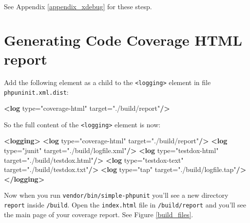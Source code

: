 \documentclass[a4paperpaper,openright]{book}
\newenvironment{Shaded}{}{}
\newcommand{\KeywordTok}[1]{\textcolor[rgb]{0.00,0.44,0.13}{\textbf{#1}}}
\newcommand{\OtherTok}[1]{\textcolor[rgb]{0.00,0.44,0.13}{#1}}
\newcommand{\StringTok}[1]{\textcolor[rgb]{0.25,0.44,0.63}{#1}}
\begin{document}
See Appendix \ref{appendix_xdebug} for these stesp.

\hypertarget{generating-code-coverage-html-report}{%
\section{Generating Code Coverage HTML
report}\label{generating-code-coverage-html-report}}

Add the following element as a child to the
\texttt{\textless{}logging\textgreater{}} element in file
\texttt{phpuninit.xml.dist}:

\begin{Shaded}
\begin{Highlighting}[]
        \KeywordTok{<log}\OtherTok{ type=}\StringTok{"coverage-html"}\OtherTok{ target=}\StringTok{"./build/report"}\KeywordTok{/>}
\end{Highlighting}
\end{Shaded}

So the full content of the \texttt{\textless{}logging\textgreater{}}
element is now:

\begin{Shaded}
\begin{Highlighting}[]
    \KeywordTok{<logging>}
        \KeywordTok{<log}\OtherTok{ type=}\StringTok{"coverage-html"}\OtherTok{ target=}\StringTok{"./build/report"}\KeywordTok{/>}
        \KeywordTok{<log}\OtherTok{ type=}\StringTok{"junit"}\OtherTok{ target=}\StringTok{"./build/logfile.xml"}\KeywordTok{/>}
        \KeywordTok{<log}\OtherTok{ type=}\StringTok{"testdox-html"}\OtherTok{ target=}\StringTok{"./build/testdox.html"}\KeywordTok{/>}
        \KeywordTok{<log}\OtherTok{ type=}\StringTok{"testdox-text"}\OtherTok{ target=}\StringTok{"./build/testdox.txt"}\KeywordTok{/>}
        \KeywordTok{<log}\OtherTok{ type=}\StringTok{"tap"}\OtherTok{ target=}\StringTok{"./build/logfile.tap"}\KeywordTok{/>}
    \KeywordTok{</logging>}
\end{Highlighting}
\end{Shaded}

Now when you run \texttt{vendor/bin/simple-phpunit} you'll see a new
directory \texttt{report} inside \texttt{/build}. Open the
\texttt{index.html} file in \texttt{/build/report} and you'll see the
main page of your coverage report. See Figure \ref{build_files}.
\end{document}
